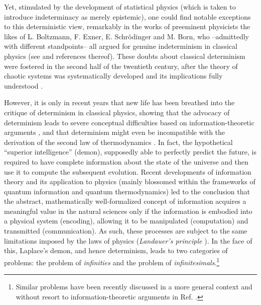 \documentclass[12pt]{article}
\begin{document}
Yet, stimulated by the development of statistical physics (which is taken to introduce indeterminacy as merely epistemic), one could find notable exceptions to this deterministic view, remarkably in the works of preeminent physicists the likes of L. Boltzmann, F. Exner, E. Schr{\"o}dinger and M. Born, who --admittedly with different standpoints-- all argued for genuine indeterminism in classical physics (see \cite{delsanto} and references thereof). These doubts about classical determinism were fostered in the second half of the twentieth century, after the theory of chaotic systems was systematically developed and its implications fully understood \cite{ornstein, prigogine}.

However, it is only in recent years that new life has been breathed into the critique of determinism in classical physics, showing that the advocacy of determinism leads to severe conceptual difficulties based on information-theoretic arguments \cite{dowek, gisin1, blundell}, and that determinism might even be incompatible with the derivation of the second law of thermodynamics \cite{drossel}. In fact, the hypothetical ``superior intelligence'' (demon), supposedly able to perfectly predict the future, is required to have complete information about the state of the universe and then use it to compute the subsequent evolution. Recent developments of information theory and its application to physics (mainly blossomed within the frameworks of quantum information and quantum thermodynamics) led to the conclusion that the abstract, mathematically well-formalized concept of information acquires a meaningful value in the natural sciences only if the information is embodied into a physical system (encoding), allowing it to be manipulated (computation) and transmitted (communication). As such, these processes are subject to the same limitations imposed by the laws of physics (\emph{Landauer's principle} \cite{landauer}). In the face of this, Laplace's demon, and hence determinism, leads to two categories of problems: the problem of \emph{infinities} and the problem of \emph{infinitesimals}.\footnote{Similar problems have  been recently discussed in a more general context and without resort to information-theoretic arguments in Ref. \cite{ellisinf}.}
\end{document}
